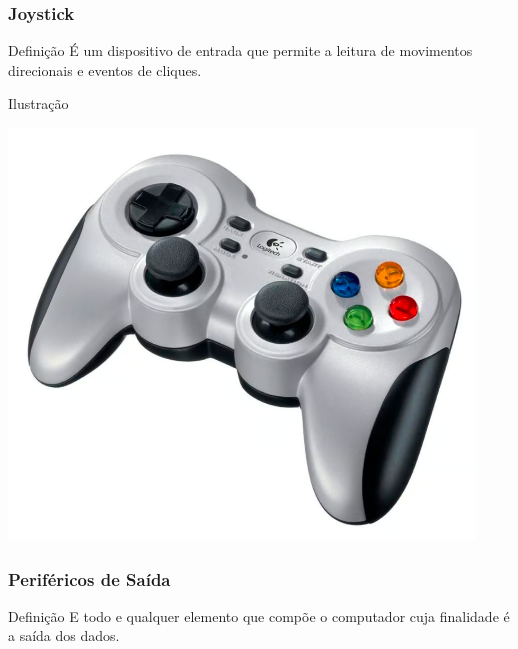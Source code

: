\documentclass[aspectratio=169]{beamer} %
\begin{document}
\begin{frame}
	\frametitle{Joystick}
	
	\begin{block}{Defini\c cão}
		É um dispositivo de entrada que permite a leitura de movimentos direcionais e eventos de cliques.
	\end{block}\vfill
	
	\begin{exampleblock}{Ilustra\c cão}
		\begin{center}
			\includegraphics[scale=0.5]{img/joystick}
		\end{center}		
	\end{exampleblock}
\end{frame}

\begin{frame}
	\frametitle{Periféricos de Saída}
	
	\begin{block}{Defini\c cão}
		E todo e qualquer elemento que compõe o computador cuja finalidade é a saída dos dados.
	\end{block}
\end{frame}
\end{document}
